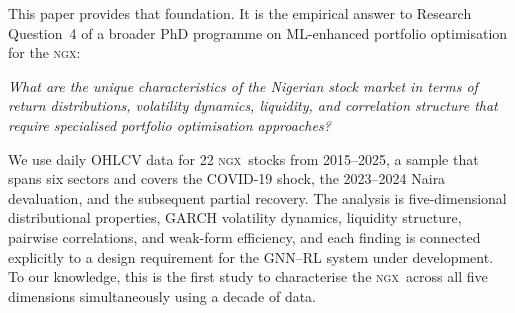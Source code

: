 \documentclass[twoside,11pt]{article}
\newcommand{\ngx}{\textsc{ngx}}
\begin{document}
	This paper provides that foundation. It is the empirical answer to Research Question~4 of a broader PhD programme on ML-enhanced portfolio optimisation for the \ngx:
	
	\medskip
	\noindent\textit{What are the unique characteristics of the Nigerian stock market in terms of return distributions, volatility dynamics, liquidity, and correlation structure that require specialised portfolio optimisation approaches?}
	\medskip
	
	We use daily OHLCV data for 22 \ngx\ stocks from 2015--2025, a sample that spans six sectors and covers the COVID-19 shock, the	2023--2024 Naira devaluation, and the subsequent partial recovery. The analysis is five-dimensional distributional properties,	GARCH volatility dynamics, liquidity structure, pairwise
	correlations, and weak-form efficiency, and each finding is connected explicitly to a design requirement for the GNN--RL system under development. To our knowledge, this is the first study to characterise the \ngx\ across all five dimensions simultaneously using a decade of data.
	
\end{document}
